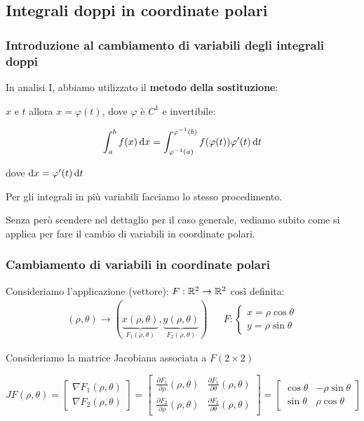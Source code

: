 \subsection{Integrali doppi in coordinate polari}

\subsubsection{Introduzione al cambiamento di variabili degli integrali doppi}

In analisi I, abbiamo utilizzato il \textbf{metodo della sostituzione}:

\(x\) e \(t\) allora \(x=\varphi(t)\), dove \(\varphi \) è \(C^{1}\) e invertibile:

\[
    \int_{a}^{b} {f(x)} \mathop{}\!\mathrm{d}{x} = \int_{\varphi^{-1}(a)}^{\varphi^{-1}(b)} {f(\varphi(t))\varphi'(t)} \mathop{}\!\mathrm{d}{t}
\]

dove \(\mathop{}\!\mathrm{d}{x} = \varphi'(t) \mathop{}\!\mathrm{d}{t}\)

Per gli integrali in più variabili facciamo lo stesso procedimento.

Senza però scendere nel dettaglio per il caso generale, vediamo subito come si applica per fare il cambio di variabili in coordinate polari.

\pagebreak
\subsubsection{Cambiamento di variabili in coordinate polari}

Consideriamo l'applicazione (vettore): \(F: \mathbb{R}^2 \to \mathbb{R}^2\) così definita:
\begin{align*}
    (\rho, \theta) \to (\underbrace{x(\rho, \theta)}_\text{\(F_1(\rho, \theta)\)}, \underbrace{y(\rho, \theta)}_\text{\(F_2(\rho,\theta)\)})
     &  &
    F: \begin{cases}
           x=\rho \cos \theta \\
           y = \rho \sin \theta
       \end{cases}
\end{align*}

Consideriamo la matrice Jacobiana associata a \(F(2\times 2 )\)

\[
    JF(\rho,\theta) = \begin{bmatrix}
        \nabla F_1(\rho,\theta) \\[2mm]
        \nabla F_2(\rho,\theta)
    \end{bmatrix} = \begin{bmatrix}
        \frac{\partial F_1}{\partial \rho}(\rho,\theta) & \frac{\partial F_1}{\partial \theta}(\rho,\theta) \\[2mm]
        \frac{\partial F_2}{\partial \rho}(\rho,\theta) & \frac{\partial F_2}{\partial \theta}(\rho,\theta)
    \end{bmatrix} = \begin{bmatrix}
        \cos \theta & -\rho \sin \theta \\
        \sin \theta & \rho \cos \theta
    \end{bmatrix}
\]

